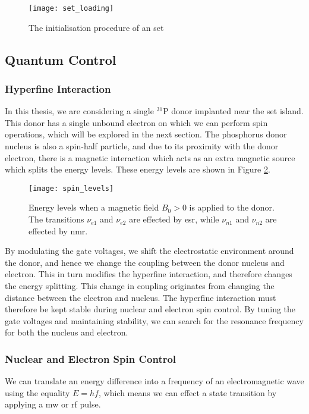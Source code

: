 	\begin{figure}[htbp!]
		\centering
		\texttt{[image: set\_loading]}
		\caption[The initiliasation prodedure]{The initialisation procedure of an \gls{set}\cite{morello2010single}}
		\label{fig::set_loading}
	\end{figure}
	
\subsection{Quantum Control}
	\subsubsection{Hyperfine Interaction}
		In this thesis, we are considering a single $^{31}$P donor implanted near the \gls{set} island. This donor has a single unbound electron on which we can perform spin operations, which will be explored in the next section. The phosphorus donor nucleus is also a spin-half particle, and due to its proximity with the donor electron, there is a magnetic interaction which acts as an extra magnetic source which splits the energy levels. These energy levels are shown in Figure \ref{fig::spin_levels}.
		\begin{figure}[htbp]
			\centering
			\texttt{[image: spin\_levels]}
			\caption[Energy levels of a $^{31}$P and electron spin system under magnetic bias.]{Energy levels when a magnetic field $B_0 > 0$ is applied to the donor. The transitions $\nu_{e1}$ and $\nu_{e2}$ are effected by \gls{esr}, while $\nu_{n1}$ and $\nu_{n2}$ are effected by \gls{nmr}.} 
			\label{fig::spin_levels}
		\end{figure}
		
		By modulating the gate voltages, we shift the electrostatic environment around the donor, and hence we change the coupling between the donor nucleus and electron. This in turn modifies the hyperfine interaction, and therefore changes the energy splitting. This change in coupling originates from changing the distance between the electron and nucleus.
		The hyperfine interaction must therefore be kept stable during nuclear and electron spin control. By tuning the gate voltages and maintaining stability, we can search for the resonance frequency for both the nucleus and electron. 
	\subsubsection{Nuclear and Electron Spin Control}
		\label{sec::nuc_spin_map}
		We can translate an energy difference into a frequency of an electromagnetic wave using the equality $E = h f$, which means we can effect a state transition by applying a \gls{mw} or \gls{rf} pulse.
		
